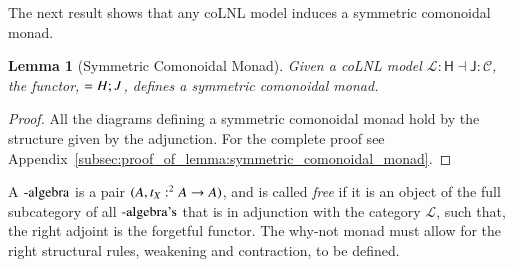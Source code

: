 \documentclass{lmcs}
\newtheorem{lemma}[theorem]{Lemma}
\let\mto\to
\let\to\relax
\newcommand{\to}{\rightarrow}
\let\wn\relax
\newcommand{\cat}[1]{\mathcal{#1}}
\newcommand{\func}[1]{\mathsf{#1}}
\newcommand{\wn}[0]{\mathop{?}}
\begin{document}
The next result shows that any coLNL model induces a symmetric
comonoidal monad.
\begin{lemma}[Symmetric Comonoidal Monad]
  \label{lemma:symmetric_comonoidal_monad}
  Given a coLNL model $\cat{L} : \func{H} \dashv \func{J} : \cat{C}$,
  the functor, $\wn = H;J$, defines a symmetric comonoidal monad.
\end{lemma}
\begin{proof}
  All the diagrams defining a symmetric comonoidal monad hold by the
  structure given by the adjunction.  For the complete proof see
  Appendix~\ref{subsec:proof_of_lemma:symmetric_comonoidal_monad}.
\end{proof}

A $\wn\text{-algebra}$ is a pair $(\wn A, t_X : \wn^2 A \mto \wn A)$,
and is called \textit{free} if it is an object of the full subcategory
of all $\wn\text{-algebra's}$ that is in adjunction with the category
$\cat{L}$, such that, the right adjoint is the forgetful functor.  The
why-not monad must allow for the right structural rules, weakening and
contraction, to be defined.
\end{document}
